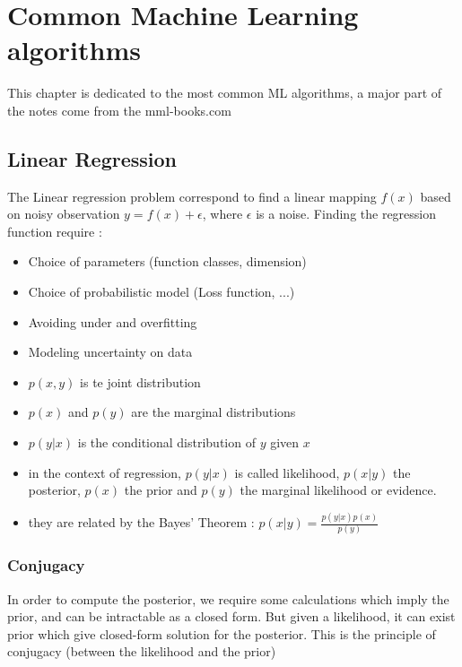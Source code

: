 \chapter{Common Machine Learning algorithms}\label{ch:introduction}

This chapter is dedicated to the most common ML algorithms, a major part of the notes come from the mml-books.com 

\section{Linear Regression}

	The Linear regression problem correspond to find a linear mapping $f(x)$ based on noisy observation $y = f(x) + \epsilon$, where $\epsilon$ is a noise. 
	Finding the regression function require : 
	\begin{itemize}
		\item Choice of parameters (function classes, dimension)
		\item Choice of probabilistic model (Loss function, ...)
		\item Avoiding under and overfitting
		\item Modeling uncertainty on data
	\end{itemize}

	\begin{definition}
			\begin{itemize}
				\item $p(x, y)$ is te joint distribution
				\item $p(x)$ and $p(y)$ are the marginal distributions
				\item $p(y|x)$ is the conditional distribution of $y$ given $x$
			 	\item in the context of regression, $p(y|x)$ is called likelihood, $p(x|y)$ the posterior, $p(x)$ the prior and $p(y)$ the marginal likelihood or evidence.
			 	\item they are related by the Bayes' Theorem : $p(x|y) = \frac{p(y|x)p(x)}{p(y)}$ 
			\end{itemize}
		\end{definition}

	\subsection{Conjugacy} %
	\label{sub:conjugacy}
		In order to compute the posterior, we require some calculations which imply the prior, and can be intractable as a closed form. But given a likelihood, it can exist prior which give closed-form solution for the posterior. This is the principle of conjugacy (between the likelihood and the prior)
